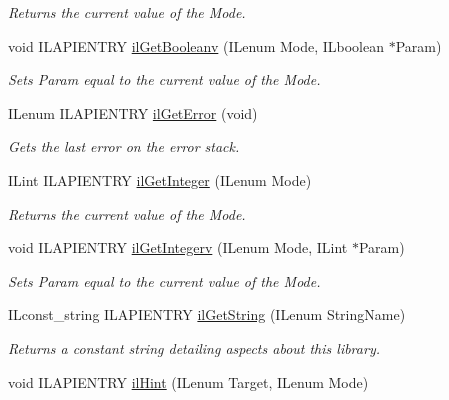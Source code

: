 \begin{DoxyCompactItemize}
\begin{DoxyCompactList}\small\item\em Returns the current value of the {\itshape Mode}. \end{DoxyCompactList}\item 
\hypertarget{group__state_ga4f52565d3e790d84e8a42b143446383e}{void I\+L\+A\+P\+I\+E\+N\+T\+R\+Y \hyperlink{group__state_ga4f52565d3e790d84e8a42b143446383e}{il\+Get\+Booleanv} (I\+Lenum Mode, I\+Lboolean $\ast$Param)}\label{group__state_ga4f52565d3e790d84e8a42b143446383e}

\begin{DoxyCompactList}\small\item\em Sets {\itshape Param} equal to the current value of the {\itshape Mode}. \end{DoxyCompactList}\item 
I\+Lenum I\+L\+A\+P\+I\+E\+N\+T\+R\+Y \hyperlink{group__state_ga6a4486f21a6ee2812033aeda6c4b320e}{il\+Get\+Error} (void)
\begin{DoxyCompactList}\small\item\em Gets the last error on the error stack. \end{DoxyCompactList}\item 
I\+Lint I\+L\+A\+P\+I\+E\+N\+T\+R\+Y \hyperlink{group__state_gac4d450b2397f016bbe00b0a0e4b53a0c}{il\+Get\+Integer} (I\+Lenum Mode)
\begin{DoxyCompactList}\small\item\em Returns the current value of the {\itshape Mode}. \end{DoxyCompactList}\item 
void I\+L\+A\+P\+I\+E\+N\+T\+R\+Y \hyperlink{group__state_ga4ed72709140871f480987a8c043ca4b8}{il\+Get\+Integerv} (I\+Lenum Mode, I\+Lint $\ast$Param)
\begin{DoxyCompactList}\small\item\em Sets {\itshape Param} equal to the current value of the {\itshape Mode}. \end{DoxyCompactList}\item 
I\+Lconst\+\_\+string I\+L\+A\+P\+I\+E\+N\+T\+R\+Y \hyperlink{group__state_ga29fd50e44b7e69435d64f82613438e4f}{il\+Get\+String} (I\+Lenum String\+Name)
\begin{DoxyCompactList}\small\item\em Returns a constant string detailing aspects about this library. \end{DoxyCompactList}\item 
void I\+L\+A\+P\+I\+E\+N\+T\+R\+Y \hyperlink{group__state_gad6f73e9f63ca905c29637f07e54cc604}{il\+Hint} (I\+Lenum Target, I\+Lenum Mode)

\end{DoxyCompactItemize}
